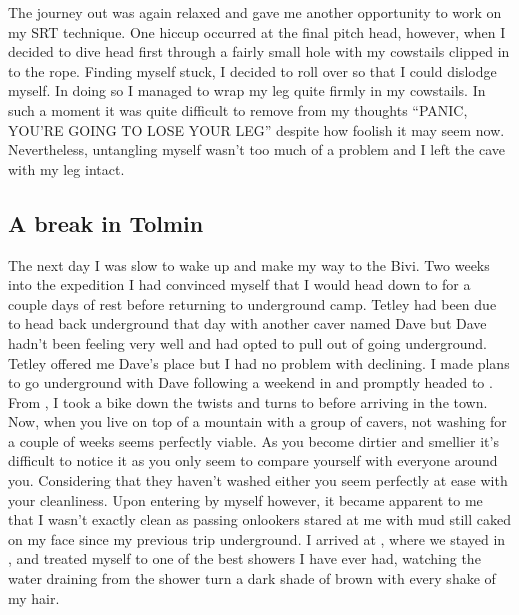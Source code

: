 
The journey out was again relaxed and gave me another opportunity to
work on my SRT technique. One hiccup occurred at the final pitch head,
however, when I decided to dive head first through a fairly small hole
with my cowstails clipped in to the rope. Finding myself stuck, I
decided to roll over so that I could dislodge myself. In doing so I
managed to wrap my leg quite firmly in my cowstails. In such a moment it
was quite difficult to remove from my thoughts ``PANIC, YOU'RE GOING TO
LOSE YOUR LEG'' despite how foolish it may seem now. Nevertheless,
untangling myself wasn't too much of a problem and I left the cave with
my leg intact.

\subsection{A break in Tolmin}

The next day I was slow to wake up and make my way to the Bivi. Two
weeks into the expedition I had convinced myself that I would head down
to  for a couple days of rest before returning to underground
camp. Tetley had been due to head back underground that day with another
caver named Dave but Dave hadn't been feeling very well and had opted to
pull out of going underground. Tetley offered me Dave's place but I had
no problem with declining. I made plans to go underground with Dave
following a weekend in  and promptly headed to . From ,
I took a bike down the twists and turns to  before arriving in the
town. Now, when you live on top of a mountain with a group of cavers,
not washing for a couple of weeks seems perfectly viable. As you become
dirtier and smellier it's difficult to notice it as you only seem to
compare yourself with everyone around you. Considering that they haven't
washed either you seem perfectly at ease with your cleanliness. Upon
entering  by myself however, it became apparent to me that I
wasn't exactly clean as passing onlookers stared at me with mud still
caked on my face since my previous trip underground. I arrived at
, where we stayed in , and treated myself to one of
the best showers I have ever had, watching the water draining from the
shower turn a dark shade of brown with every shake of my hair.

